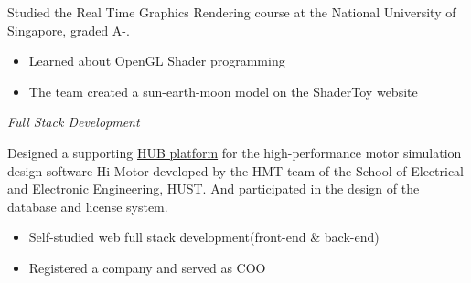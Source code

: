 \documentclass{uniquecv}
\begin{document}
Studied the Real Time Graphics Rendering course at the National University of Singapore, graded A-.
\begin{itemize}
    \item Learned about OpenGL Shader programming
    \item The team created a sun-earth-moon model on the ShaderToy website
\end{itemize}

\textit{Full Stack Development}
\vspace{0.4ex}

Designed a supporting \href{https://hub.hi-motor.site/index/home}{HUB platform} for the high-performance motor simulation design software Hi-Motor developed by the HMT team of the School of Electrical and Electronic Engineering, HUST. And participated in the design of the database and license system.
\begin{itemize}
    \item Self-studied web full stack development(front-end \& back-end)
    \item Registered a company and served as COO
\end{itemize}


\end{document}
